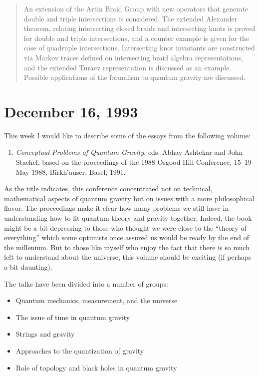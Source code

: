 \documentclass[12pt]{article}
\def\tightlist{}
\begin{document}
\begin{quote}
An extension of the Artin Braid Group with new operators that generate
double and triple intersections is considered. The extended Alexander
theorem, relating intersecting closed braids and intersecting knots is
proved for double and triple intersections, and a counter example is
given for the case of quadruple intersections. Intersecting knot
invariants are constructed via Markov traces defined on intersecting
braid algebra representations, and the extended Turaev representation is
discussed as an example. Possible applications of the formalism to
quantum gravity are discussed.
\end{quote}



\hypertarget{week27}{%
\section{December 16, 1993}\label{week27}}

This week I would like to describe some of the essays from the following
volume:

\begin{enumerate}
\def\labelenumi{\arabic{enumi})}
\tightlist
\item
  \emph{Conceptual Problems of Quantum Gravity}, eds. 
   Abhay Ashtekar and John Stachel, based on the proceedings of the 1988 Osgood
  Hill Conference, 15--19 May 1988, Birkh\''auser, Basel, 1991.
\end{enumerate}
\noindent
As the title indicates, this conference concentrated not on technical,
mathematical aspects of quantum gravity but on issues with a more
philosophical flavor. The proceedings make it clear how many problems we
still have in understanding how to fit quantum theory and gravity
together. Indeed, the book might be a bit depressing to those who
thought we were close to the ``theory of everything'' which some
optimists once assured us would be ready by the end of the millenium.
But to those like myself who enjoy the fact that there is so much left
to understand about the universe, this volume should be exciting (if
perhaps a bit daunting).

The talks have been divided into a number of groups:

\begin{itemize}
\tightlist
\item
  Quantum mechanics, measurement, and the universe
\item
  The issue of time in quantum gravity
\item
  Strings and gravity
\item
  Approaches to the quantization of gravity
\item
  Role of topology and black holes in quantum gravity
\end{itemize}
\end{document}
